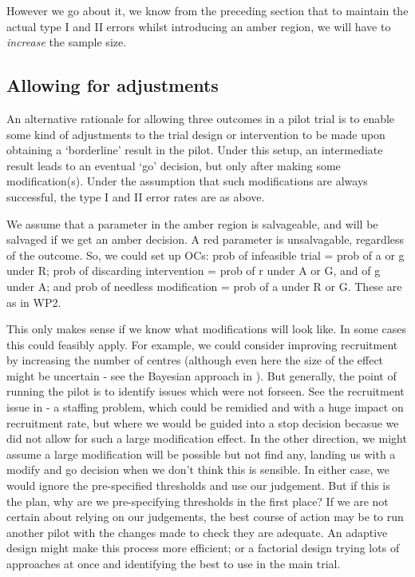 \documentclass[sagev, Crown]{sagej} %
\begin{document}
However we go about it, we know from the preceding section that to maintain the actual type I and II errors whilst introducing an amber region, we will have to \emph{increase} the sample size.

\subsection{Allowing for adjustments}

An alternative rationale for allowing three outcomes in a pilot trial is to enable some kind of adjustments to the trial design or intervention to be made upon obtaining a `borderline' result in the pilot. Under this setup, an intermediate result leads to an eventual `go' decision, but only after making some modification(s). Under the assumption that such modifications are always successful, the type I and II error rates are as above. 

We assume that a parameter in the amber region is salvageable, and will be salvaged if we get an amber decision. A red parameter is unsalvagable, regardless of the outcome. So, we could set up OCs: prob of infeasible trial = prob of a or g under R; prob of discarding intervention = prob of r under A or G, and of g under A; and prob of needless modification = prob of a under R or G. These are as in WP2. 

This only makes sense if we know what modifications will look like. In some cases this could feasibly apply. For example, we could consider improving recruitment by increasing the number of centres (although even here the size of the effect might be uncertain - see the Bayesian approach in \cite{Hampson2017}). But generally, the point of running the pilot is to identify issues which were not forseen. See the recruitment issue in \cite{Avery2017} - a staffing problem, which could be remidied and with a huge impact on recruitment rate, but where we would be guided into a stop decision becasue we did not allow for such a large modification effect. In the other direction, we might assume a large modification will be possible but not find any, landing us with a modify and go decision when we don't think this is sensible. In either case, we would ignore the pre-specified thresholds and use our judgement. But if this is the plan, why are we pre-specifying thresholds in the first place? If we are not certain about relying on our judgements, the best course of action may be to run another pilot with the changes made to check they are adequate. An adaptive design might make this process more efficient; or a factorial design trying lots of approaches at once and identifying the best to use in the main trial.
\end{document}
